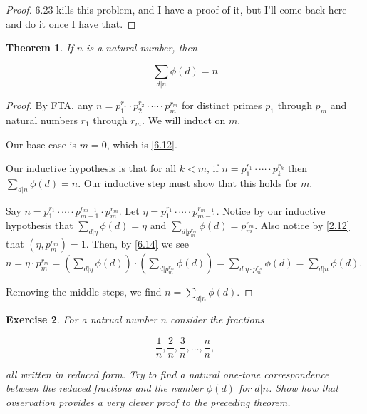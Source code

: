 \documentclass{article}
\newtheorem{thm}{Theorem}[section]
\newtheorem{ex}[thm]{Exercise}
\numberwithin{equation}{thm}
\begin{document}
\begin{proof}
  6.23 kills this problem, and I have a proof of it, but I'll come back here and do it once I have that.
\end{proof}



\begin{thm} \label{6.15}
  If $n$ is a natural number, then

  $$\sum_{d|n} \phi(d) = n$$
\end{thm}

\begin{proof}
  By FTA, any $n = p_1^{r_1} \cdot p_2^{r_2} \cdot \cdots \cdot p_m^{r_m}$ for distinct primes $p_1$ through $p_m$ and natural numbers $r_1$ through $r_m$. We will induct on $m$.

  Our base case is $m = 0$, which is \ref{6.12}.

  Our inductive hypothesis is that for all $k < m$, if $n = p_1^{r_1} \cdot \cdots \cdot p_k^{r_k}$ then $\sum_{d|n} \phi(d) = n$. Our inductive step must show that this holds for $m$.

  Say $n = p_1^{r_1} \cdot \cdots \cdot p_{m-1}^{r_{m-1}} \cdot p_m^{r_m}$. Let $\eta = p_1^{r_1} \cdot \cdots \cdot p_{m-1}^{r_{m-1}}$. Notice by our inductive hypothesis that $\sum_{d|\eta} \phi(d) = \eta$ and $\sum_{d|p_m^{r_m}} \phi(d) = p_m^{r_m}$.
  Also notice by \ref{2.12} that $(\eta, p_m^{r_m}) = 1$. Then, by \ref{6.14} we see $n = \eta \cdot p_m^{r_m} = \left( \sum_{d|\eta} \phi(d) \right) \cdot \left( \sum_{d|p_m^{r_m}} \phi(d) \right) = \sum_{d|\eta \cdot p_m^{r_m}} \phi(d) = \sum_{d|n} \phi(d)$.

  Removing the middle steps, we find $n = \sum_{d|n} \phi(d)$.
\end{proof}



\begin{ex} \label{6.16}
  For a natrual number $n$ consider the fractions

  $$\frac{1}{n}, \frac{2}{n}, \frac{3}{n}, \ldots, \frac{n}{n},$$

  all written in reduced form. Try to find a natural one-tone correspondence between the reduced fractions and the number $\phi(d)$ for $d | n$. Show how that ovservation provides a very clever proof to the preceding theorem.
\end{ex}
\end{document}
